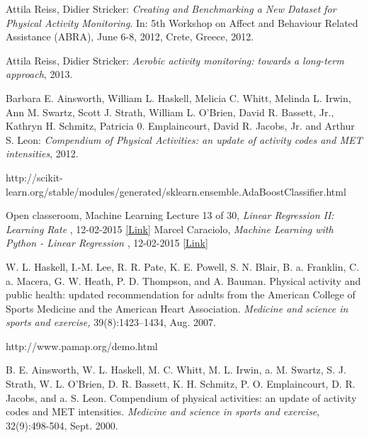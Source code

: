 \documentclass[12pt, a4paper, onecolumn, oneside, parskip=half]{scrartcl}
\begin{document}
\begin{thebibliography}{99}

  Attila Reiss, Didier Stricker: \emph{Creating and Benchmarking a New Dataset for Physical Activity Monitoring}. In: 5th Workshop on Affect and Behaviour Related Assistance (ABRA), June 6-8, 2012, Crete, Greece, 2012.
   
  Attila Reiss, Didier Stricker:
  \emph{Aerobic activity monitoring: towards a long-term approach}, 2013.

  Barbara E. Ainsworth, William L. Haskell, Melicia C. Whitt, Melinda L. Irwin, Ann M. Swartz, Scott J. Strath, William L. O'Brien, David R. Bassett, Jr., Kathryn H. Schmitz, Patricia 0. Emplaincourt, David R. Jacobs, Jr. and Arthur S. Leon:
  \emph{Compendium of Physical Activities: an
update of activity codes and
MET intensities},
  2012.
  

    
	http://scikit-learn.org/stable/modules/generated/sklearn.ensemble.AdaBoostClassifier.html
  
  
  
Open classeroom, Machine Learning Lecture 13 of 30, \emph{Linear Regression II: Learning Rate} , 12-02-2015
\href{http://openclassroom.stanford.edu/MainFolder/VideoPage.php?course=MachineLearning&video=03.2-LinearRegressionII-LearningRate}{[Link]}  
Marcel Caraciolo, \emph{Machine Learning with Python - Linear Regression} , 12-02-2015
\href{http://aimotion.blogspot.de/2011/10/machine-learning-with-python-linear.html}{[Link]}


W. L. Haskell, I.-M. Lee, R. R. Pate, K. E. Powell, S. N. Blair, B. a. Franklin, C. a. Macera, G. W. Heath, P. D. Thompson, and A. Bauman. Physical activity and public health: updated recommendation for adults from the American College of Sports Medicine and the American Heart Association. \emph{Medicine and science in sports and exercise,} 39(8):1423–1434, Aug. 2007.

http://www.pamap.org/demo.html

B. E. Ainsworth, W. L. Haskell, M. C. Whitt, M. L.
Irwin, a. M. Swartz, S. J. Strath, W. L. O'Brien, D. R.
Bassett, K. H. Schmitz, P. O. Emplaincourt, D. R.
Jacobs, and a. S. Leon. Compendium of physical
activities: an update of activity codes and MET
intensities. \emph{Medicine and science in sports and
exercise}, 32(9):498-504, Sept. 2000.

\end{thebibliography}

\listoffigures

\listoftables

\end{document}
